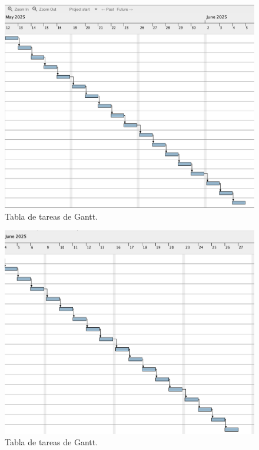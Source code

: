 \documentclass[
11pt, %
]{charter}
\begin{document}
\begin{figure}[htpb]
\centering 
\includegraphics[width=.99\textwidth]{./Figuras/gantt-2.png}
\caption{Tabla de tareas de Gantt.}
\label{fig:diagBloques}
\end{figure}

\begin{figure}[htpb]
\centering 
\includegraphics[width=.99\textwidth]{./Figuras/gantt-3.png}
\caption{Tabla de tareas de Gantt.}
\label{fig:diagBloques}
\end{figure}
\end{document}
